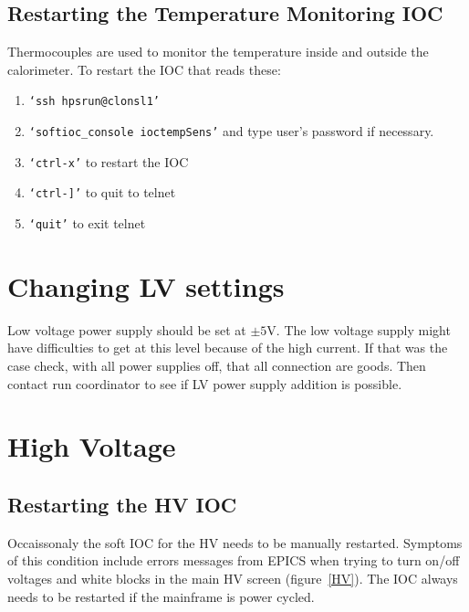 \documentclass[12pt]{article}
\begin{document}
{   \subsection{Restarting the Temperature Monitoring IOC}
   Thermocouples are used to monitor the temperature inside and outside the calorimeter.  To restart the IOC that reads these:
   {\footnotesize
   \begin{enumerate}
       \item \texttt{`ssh hpsrun@clonsl1'}
       \item \texttt{`softioc\_console ioctempSens'} and type user's password if necessary.
       \item \texttt{`ctrl-x'} to restart the IOC
       \item \texttt{`ctrl-]'} to quit to telnet
       \item \texttt{`quit'} to exit telnet
   \end{enumerate}
   }



   \section{Changing LV settings}
      Low voltage power supply should be set at $\pm5$V. The low voltage supply might have difficulties to get at this level because of the high current. If that was the case check, with all power supplies off, that all connection are goods. Then contact run coordinator to see if LV power supply addition is possible. 

   \section{High Voltage}
   \subsection{Restarting the HV IOC}
   Occaissonaly the soft IOC for the HV needs to be manually restarted.  Symptoms of this condition include errors messages from EPICS when trying to turn on/off voltages and white blocks in the main HV screen (figure~\ref{HV}).  The IOC always needs to be restarted if the mainframe is power cycled.  
   
}
\end{document}
